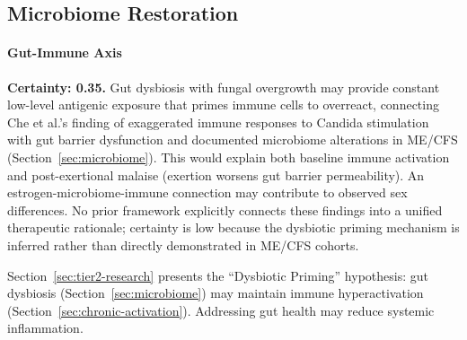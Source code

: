 \subsection{Microbiome Restoration}

\paragraph{Gut-Immune Axis}

\begin{hypothesis}
\label{hyp:dysbiotic-priming}
\textbf{Certainty: 0.35.} Gut dysbiosis with fungal overgrowth may provide constant low-level antigenic exposure that primes immune cells to overreact, connecting Che et al.'s finding of exaggerated immune responses to Candida stimulation~\cite{Che2025} with gut barrier dysfunction and documented microbiome alterations in ME/CFS (Section~\ref{sec:microbiome}). This would explain both baseline immune activation and post-exertional malaise (exertion worsens gut barrier permeability). An estrogen-microbiome-immune connection may contribute to observed sex differences. No prior framework explicitly connects these findings into a unified therapeutic rationale; certainty is low because the dysbiotic priming mechanism is inferred rather than directly demonstrated in ME/CFS cohorts.
\end{hypothesis}

Section~\ref{sec:tier2-research} presents the ``Dysbiotic Priming'' hypothesis: gut dysbiosis (Section~\ref{sec:microbiome}) may maintain immune hyperactivation (Section~\ref{sec:chronic-activation}). Addressing gut health may reduce systemic inflammation.

